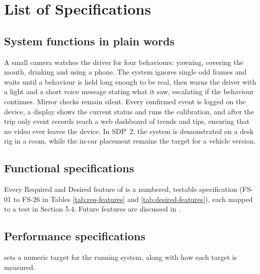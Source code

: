 \section{List of Specifications}
\label{sec:specs}
\subsection{System functions in plain words}

A small camera watches the driver for four behaviours: yawning, covering the mouth, drinking and using a phone. The system ignores single odd frames and waits until a behaviour is held long enough to be real, then warns the driver with a light and a short voice message stating what it saw, escalating if the behaviour continues. Mirror checks remain silent. Every confirmed event is logged on the device, a display shows the current status and runs the calibration, and after the trip only event records reach a web dashboard of trends and tips, ensuring that no video ever leaves the device. In SDP~2, the system is demonstrated on a desk rig in a room, while the in-car placement remains the target for a vehicle version.

\subsection{Functional specifications}

Every Required and Desired feature of  is a numbered, testable specification (FS-01 to FS-26 in Tables \ref{tab:req-features} and \ref{tab:desired-features}), each mapped to a test in Section 5.4. Future features are discussed in .

\subsection{Performance specifications}

 sets a numeric target for the running system, along with how each target is measured.

